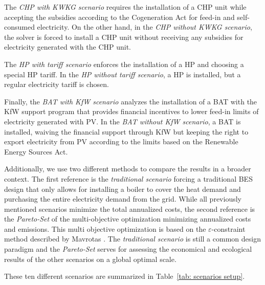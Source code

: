 The \emph{CHP with KWKG scenario} requires the installation of a CHP unit while accepting the subsidies according to the Cogeneration Act for feed-in and self-consumed electricity.
On the other hand, in the \emph{CHP without KWKG scenario}, the solver is forced to install a CHP unit without receiving any subsidies for electricity generated with the CHP unit.

The \emph{HP with tariff scenario} enforces the installation of a HP and choosing a special HP tariff.
In the \emph{HP without tariff scenario}, a HP is installed, but a regular electricity tariff is chosen.

Finally, the \emph{BAT with KfW scenario} analyzes the installation of a BAT with the KfW support program that provides financial incentives to lower feed-in limits of electricity generated with PV.
In the \emph{BAT without KfW scenario}, a BAT is installed, waiving the financial support through KfW but keeping the right to export electricity from PV according to the limits based on the Renewable Energy Sources Act.

Additionally, we use two different methods to compare the results in a broader context.
The first reference is the \emph{traditional scenario} forcing a traditional BES design that only allows for installing a boiler to cover the heat demand and purchasing the entire electricity demand from the grid.
While all previously mentioned scenarios minimize the total annualized costs, the second reference is the \emph{Pareto-Set} of the multi-objective optimization minimizing annualized costs and emissions.
This multi objective optimization is based on the $\varepsilon$-constraint method described by Mavrotas \cite{Mavrotas2009}.
The \emph{traditional scenario} is still a common design paradigm and the \emph{Pareto-Set} serves for assessing the economical and ecological results of the other scenarios on a global optimal scale.

These ten different scenarios are summarized in Table~\ref{tab: scenarios setup}.


